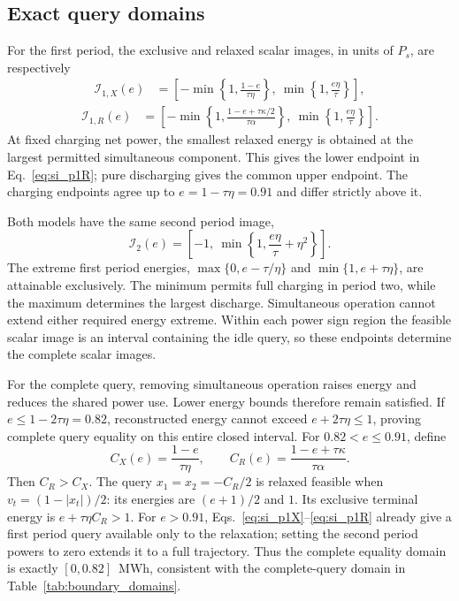 \subsection{Exact query domains}
\label{si:temporal_domains_proof}
For the first period, the exclusive and relaxed scalar images, in units of $P_s$, are respectively
\begin{equation}\begin{aligned}
\mathcal I_{1, X}(e)&=\left[-\min\left\{1,\frac{1-e}{\tau\eta}\right\},\ \min\left\{1,\frac{e\eta}{\tau}\right\}\right],\label{eq:si_p1X}\end{aligned}\end{equation}
\begin{equation}\begin{aligned}
\mathcal I_{1, R}(e)&=\left[-\min\left\{1,\frac{1-e+\tau\kappa/2}{\tau\alpha}\right\},\ \min\left\{1,\frac{e\eta}{\tau}\right\}\right].\label{eq:si_p1R}
\end{aligned}\end{equation}
At fixed charging net power, the smallest relaxed energy is obtained at the largest permitted simultaneous component. This gives the lower endpoint in Eq.~\eqref{eq:si_p1R}; pure discharging gives the common upper endpoint. The charging endpoints agree up to $e=1-\tau\eta=0.91$ and differ strictly above it.

Both models have the same second period image,
\begin{equation}
\mathcal I_2(e)=\left[-1,\ \min\left\{1,\frac{e\eta}{\tau}+\eta^2\right\}\right].
\label{eq:si_p2}
\end{equation}
The extreme first period energies, $\max\{0,e-\tau/\eta\}$ and $\min\{1,e+\tau\eta\}$, are attainable exclusively. The minimum permits full charging in period two, while the maximum determines the largest discharge. Simultaneous operation cannot extend either required energy extreme. Within each power sign region the feasible scalar image is an interval containing the idle query, so these endpoints determine the complete scalar images.

For the complete query, removing simultaneous operation raises energy and reduces the shared power use. Lower energy bounds therefore remain satisfied. If $e\leq1-2\tau\eta=0.82$, reconstructed energy cannot exceed $e+2\tau\eta\leq1$, proving complete query equality on this entire closed interval. For $0.82<e\leq0.91$, define
\begin{equation}
C_X(e)=\frac{1-e}{\tau\eta},\qquad
C_R(e)=\frac{1-e+\tau\kappa}{\tau\alpha}.
\label{eq:si_temporal_cuts}
\end{equation}
Then $C_R>C_X$. The query $x_1=x_2=-C_R/2$ is relaxed feasible when $v_t=(1-|x_t|)/2$: its energies are $(e+1)/2$ and $1$. Its exclusive terminal energy is $e+\tau\eta C_R>1$. For $e>0.91$, Eqs.~\eqref{eq:si_p1X}--\eqref{eq:si_p1R} already give a first period query available only to the relaxation; setting the second period powers to zero extends it to a full trajectory. Thus the complete equality domain is exactly $[0,0.82]$~MWh, consistent with the complete-query domain in Table~\ref{tab:boundary_domains}.

